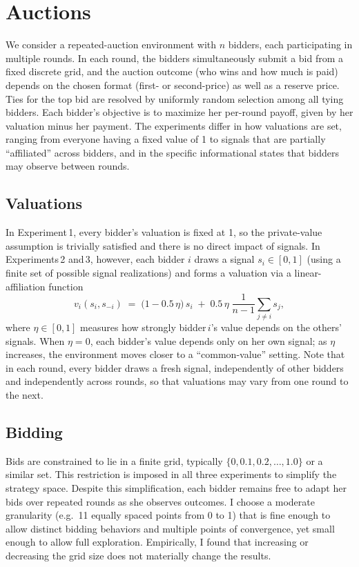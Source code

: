 \section{Auctions}

We consider a repeated-auction environment with $n$ bidders, each participating in multiple rounds. In each round, the bidders simultaneously submit a bid from a fixed discrete grid, and the auction outcome (who wins and how much is paid) depends on the chosen format (first- or second-price) as well as a reserve price. Ties for the top bid are resolved by uniformly random selection among all tying bidders. Each bidder's objective is to maximize her per-round payoff, given by her valuation minus her payment. The experiments differ in how valuations are set, ranging from everyone having a fixed value of 1 to signals that are partially ``affiliated'' across bidders, and in the specific informational states that bidders may observe between rounds.

\subsection{Valuations}

In Experiment\,1, every bidder's valuation is fixed at 1, so the private-value assumption is trivially satisfied and there is no direct impact of signals. In Experiments\,2 and\,3, however, each bidder $i$ draws a signal $s_{i}\in [0,1]$ (using a finite set of possible signal realizations) and forms a valuation via a linear-affiliation function
\[
v_{i}(s_{i}, s_{-i}) \;=\; \bigl(1 - 0.5\,\eta\bigr)\,s_{i} \;+\; 0.5\,\eta\;\frac{1}{n-1}\sum_{j\neq i} s_{j},
\]
where $\eta\in[0,1]$ measures how strongly bidder\,$i$'s value depends on the others' signals. When $\eta=0$, each bidder's value depends only on her own signal; as $\eta$ increases, the environment moves closer to a ``common-value'' setting. Note that in each round, every bidder draws a fresh signal, independently of other bidders and independently across rounds, so that valuations may vary from one round to the next.

\subsection{Bidding}

Bids are constrained to lie in a finite grid, typically $\{0,0.1,0.2,\ldots,1.0\}$ or a similar set. This restriction is imposed in all three experiments to simplify the strategy space. Despite this simplification, each bidder remains free to adapt her bids over repeated rounds as she observes outcomes. I choose a moderate granularity (e.g.\ 11 equally spaced points from 0 to 1) that is fine enough to allow distinct bidding behaviors and multiple points of convergence, yet small enough to allow full exploration. Empirically, I found that increasing or decreasing the grid size does not materially change the results.

